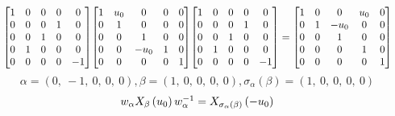 \documentclass[11pt]{article}
\theoremstyle{definition}
\begin{document}
\[
\scaletoalign{\textwidth}{{\left[\begin{matrix}1 & 0 & 0 & 0 & 0\\0 & 0 & 0 & 1 & 0\\0 & 0 & 1 & 0 & 0\\0 & 1 & 0 & 0 & 0\\0 & 0 & 0 & 0 & -1\end{matrix}\right]} {\left[\begin{matrix}1 & u_{0} & 0 & 0 & 0\\0 & 1 & 0 & 0 & 0\\0 & 0 & 1 & 0 & 0\\0 & 0 & - u_{0} & 1 & 0\\0 & 0 & 0 & 0 & 1\end{matrix}\right]} {\left[\begin{matrix}1 & 0 & 0 & 0 & 0\\0 & 0 & 0 & 1 & 0\\0 & 0 & 1 & 0 & 0\\0 & 1 & 0 & 0 & 0\\0 & 0 & 0 & 0 & -1\end{matrix}\right]} = {\left[\begin{matrix}1 & 0 & 0 & u_{0} & 0\\0 & 1 & - u_{0} & 0 & 0\\0 & 0 & 1 & 0 & 0\\0 & 0 & 0 & 1 & 0\\0 & 0 & 0 & 0 & 1\end{matrix}\right]}}
\]
\[
\alpha = \left( 0, \  -1, \  0, \  0, \  0\right), \beta = \left( 1, \  0, \  0, \  0, \  0\right), \sigma_{\alpha}(\beta) = \left( 1, \  0, \  0, \  0, \  0\right)
\]
\[
\scaletoalign{\textwidth}{w_{\alpha} X_{\beta}\left(u_{0}\right) w_{\alpha}^{-1} = X_{\sigma_{\alpha}\left(\beta\right)}\left(- u_{0}\right)}
\]
\end{document}
